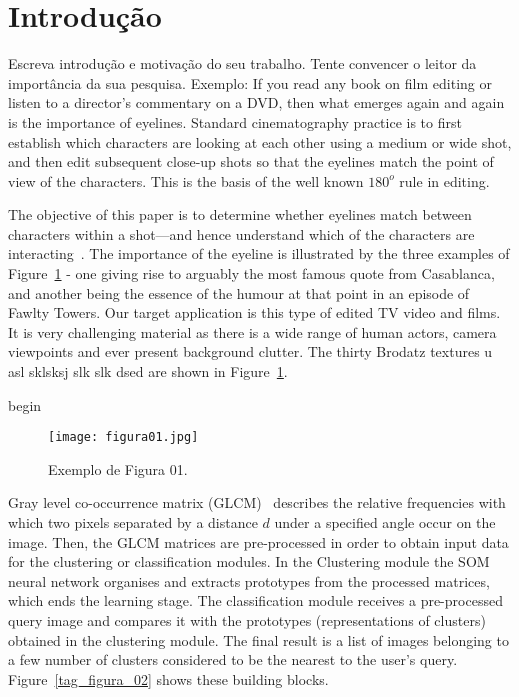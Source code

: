 \documentclass{classe_cn}                 %
\begin{document}
\section{Introdução}

Escreva introdução e motivação do seu trabalho. Tente convencer o leitor da importância da sua pesquisa. Exemplo: If you read any book on film editing or listen to a director's commentary on a DVD, then what emerges again and again is the importance of eyelines. Standard cinematography practice is to first establish which characters are looking at each other using a medium or wide shot, and then edit subsequent close-up shots so that the eyelines match the point of view of the characters. This is the basis of the well known $180^{o}$ rule in editing.

The objective of this paper is to determine whether eyelines match between characters within a shot—and hence understand which of the characters are interacting~\cite{Pressman:2007}. The importance of the eyeline is illustrated by the three examples of Figure~\ref{tag_figura_01} - one giving rise to arguably the most famous quote from Casablanca, and another being the essence of the humour at that point in an episode of Fawlty Towers. Our target application is this type of edited TV video and films. It is very challenging material as there is a wide range of human actors, camera viewpoints and ever present background clutter. The thirty Brodatz textures u asl sklsksj slk slk dsed are shown in Figure~\ref{tag_figura_01}.

begin
\begin{figure}[h!]
  \begin{center}
    \texttt{[image: figura01.jpg]}
    \caption{Exemplo de Figura 01.} 
    \label{tag_figura_01}
  \end{center}
\end{figure}

Gray level co-occurrence matrix (GLCM)~\cite{Ferris:2003} describes the relative frequencies with which two pixels separated by a distance $d$ under a specified angle occur on the image. Then, the GLCM matrices are pre-processed in order to obtain input data for the clustering or classification modules. In the Clustering module the SOM neural network organises and extracts prototypes from the processed matrices, which ends the learning stage. The classification module receives a pre-processed query image and compares it with the prototypes (representations of clusters) obtained in the clustering module. The final result is a list of images belonging to a few number of clusters considered to be the nearest to the user's query. Figure~\ref{tag_figura_02} shows these building blocks.
\end{document}
